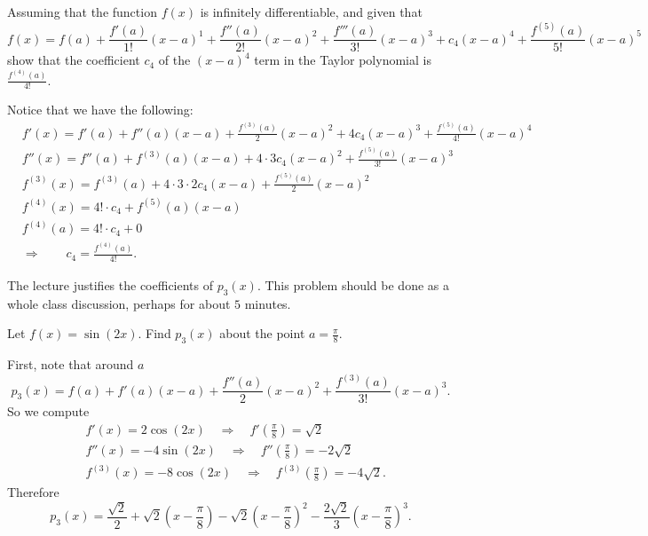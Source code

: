 \documentclass[noinstructornotes]{ximera}
\begin{document}
\begin{problem}
Assuming that the function $f(x)$ is infinitely differentiable, and given that
	\[
	f(x) = f(a) + \frac{f'(a)}{1!}(x-a)^1 + \frac{f''(a)}{2!}(x-a)^2 + \frac{f'''(a)}{3!}(x-a)^3 + c_4 (x-a)^4 + \frac{f^{(5)}(a)}{5!}(x-a)^5
	\]
show that the coefficient $c_4$ of the $(x-a)^4$ term in the Taylor polynomial is $\frac{f^{(4)}(a)}{4!}$.  
	\begin{freeResponse}
	Notice that we have the following:
		\begin{align*}
		&f'(x) =  f'(a) + f''(a)(x-a) + \frac{f^{(3)}(a)}{2} (x-a)^2 + 4 c_4 (x-a)^3 + \frac{f^{(5)}(a)}{4!}(x-a)^4  \\
		&f''(x) =  f''(a) + f^{(3)}(a) (x-a) + 4 \cdot 3 c_4 (x-a)^2 + \frac{f^{(5)}(a)}{3!}(x-a)^3  \\
		&f^{(3)}(x) =  f^{(3)}(a) + 4 \cdot 3 \cdot 2 c_4 (x-a)  + \frac{f^{(5)}(a)}{2}(x-a)^2 \\
		&f^{(4)}(x) =   4! \cdot c_4 + f^{(5)}(a)(x-a)  \\
		&f^{(4)}(a) = 4! \cdot c_4 + 0  \\
		&\Longrightarrow \qquad \boxed{c_4 = \frac{f^{(4)}(a)}{4!}}.
		\end{align*}
	\end{freeResponse}
	
\end{problem}

\begin{instructorNotes}
The lecture justifies the coefficients of $p_3(x)$.  
This problem should be done as a whole class discussion, perhaps for about $5$ minutes.  
\end{instructorNotes}







\begin{problem}
Let $f(x) = \sin(2x)$.  
Find $p_3(x)$ about the point $a = \frac{\pi}{8}$.  
	\begin{freeResponse}
	First, note that around $a$
		\[
		p_3(x) = f(a) + f'(a)(x-a) + \frac{f''(a)}{2}(x-a)^2 + \frac{f^{(3)}(a)}{3!}(x-a)^3.
		\]
	So we compute
		\begin{align*}
		&f'(x) = 2 \cos(2x) 	\quad	\Longrightarrow	\quad	f' \left( \frac{\pi}{8} \right) = \sqrt{2}  \\
		&f''(x) = -4\sin(2x) 	\quad	\Longrightarrow	\quad	f'' \left( \frac{\pi}{8} \right) = - 2 \sqrt{2}  \\
		&f^{(3)}(x) = -8\cos(2x)	\quad	\Longrightarrow	\quad	f^{(3)} \left( \frac{\pi}{8} \right) = -4\sqrt{2}.
		\end{align*}
	Therefore
		\[
		\boxed{p_3(x) = \frac{\sqrt{2}}{2} + \sqrt{2} \left( x - \frac{\pi}{8} \right) - \sqrt{2} \left( x - \frac{\pi}{8} \right)^2 - \frac{2\sqrt{2}}{3} \left( x - \frac{\pi}{8} \right)^3}.
		\]
	\end{freeResponse}
		
\end{problem}
\end{document}
